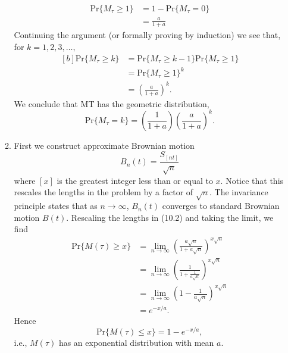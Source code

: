 \documentclass[11pt,a4paper]{article}
\begin{document}
\begin{enumerate}
\begin{enumerate}
\begin{align*}
        \text{Pr}\{M_\tau \geq 1\}
        &= 1 - \text{Pr}\{M_\tau = 0\}\\
        &= \frac{a}{1 + a}
      \end{align*}
      Continuing the argument (or formally proving by induction) we see that, for $k = 1, 2, 3,\ldots,$
      \begin{equation}\tag{10.2}
        \begin{aligned}[b]
          \text{Pr}\{M_\tau \geq k\}
          &= \text{Pr}\{M_\tau \geq k - 1\}\text{Pr}\{M_\tau \geq 1\}\\
          &= \text{Pr}\{M_\tau \geq 1\}^k\\
          &= \left(\frac{a}{1 + a}\right)^k.
        \end{aligned}
      \end{equation}
      We conclude that MT has the geometric distribution,
      $$
      \text{Pr}\{M_\tau = k\} = \left(\frac{1}{1 + a}\right)\left(\frac{a}{1 + a}\right)^k.
      $$
      \item First we construct approximate Brownian motion
      $$
      B_n(t) = \frac{S_{[nt]}}{\sqrt{n}}
      $$
      where $[x]$ is the greatest integer less than or equal to $x$. Notice that this rescales the lengths in the problem by a factor of $\sqrt{n}$. The invariance principle states that as $n \to \infty$, $B_n(t)$ converges to standard Brownian motion $B(t)$. Rescaling the lengths in (10.2) and taking the limit, we find
      \begin{align*}
        \text{Pr}\{M(\tau) \geq x\}
        &= \lim_{n\to \infty}\left(\frac{a\sqrt{n}}{1 + a\sqrt{n}}\right)^{x\sqrt{n}}\\
        &= \lim_{n\to \infty}\left(\frac{1}{1 + \frac{1}{a\sqrt{n}}}\right)^{x\sqrt{n}}\\
        &= \lim_{n\to\infty}\left(1 - \frac{1}{a\sqrt{n}}\right)^{x\sqrt{n}}\\
        &= e^{-x/a}.
      \end{align*}
      Hence
      $$
      \text{Pr}\{M(\tau) \leq x\} = 1 - e^{-x/a},
      $$
      i.e., $M(\tau)$ has an exponential distribution with mean $a$.
    \end{enumerate}
  \end{enumerate}
\end{document}
